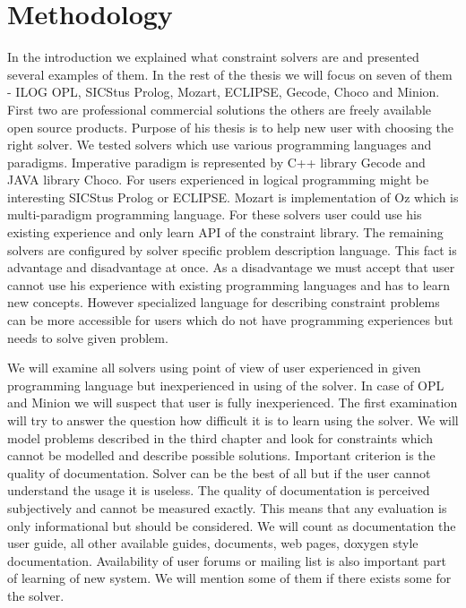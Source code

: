 \chapter{Methodology}
\thispagestyle{myheadings}

In the introduction we explained what constraint solvers are and presented several examples of them. In the rest of the thesis we will focus on seven of them - ILOG OPL, SICStus Prolog, Mozart, ECLIPSE, Gecode, Choco and Minion. First two are professional commercial solutions the others are freely available open source products. Purpose of his thesis is to help new user with choosing the right solver. We tested solvers which use various programming languages and paradigms. Imperative paradigm is represented by C++ library Gecode and JAVA library Choco. For users experienced in logical programming might be interesting SICStus Prolog or ECLIPSE. Mozart is implementation of Oz which is multi-paradigm programming language. For these solvers user could use his existing experience and only learn API of the constraint library. The remaining solvers are configured by solver specific problem description language. This fact is advantage and disadvantage at once. As a disadvantage we must accept that user cannot use his experience with existing programming languages and has to learn new concepts. However specialized language for describing constraint problems can be more accessible for users which do not have programming experiences but needs to solve given problem.

We will examine all solvers using point of view of user experienced in given programming language but inexperienced in using of the solver. In case of OPL and Minion we will suspect that user is fully inexperienced.  The first examination will try to answer the question how difficult it is to learn using the solver. We will model problems described in the third chapter and look for constraints which cannot be modelled and describe possible solutions.  Important criterion is the quality of documentation. Solver can be the best of all but if the user cannot understand the usage it is useless. The quality of documentation is perceived subjectively and cannot be measured exactly. This means that any evaluation is only informational but should be considered. We will count as documentation the user guide, all other available guides, documents, web pages, doxygen style documentation. Availability of user forums or mailing list is also important part of learning of new system. We will mention some of them if there exists some for the solver.


